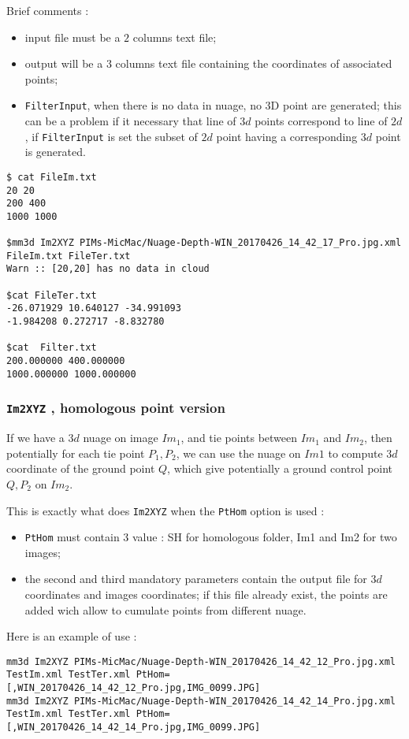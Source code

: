 Brief comments :

\begin{itemize}
    \item input file must be a $2$ columns text file;

    \item output will be a $3$ columns text file containing the coordinates of associated points;

    \item {\tt FilterInput}, when there is no data in nuage, no 3D point  are generated; this can be a problem 
          if it necessary that line of $3d$ points correspond to line of $2d$, if {\tt FilterInput}
          is set the subset of $2d$ point having a corresponding $3d$ point is generated.
\end{itemize}


\begin{verbatim}
$ cat FileIm.txt
20 20
200 400
1000 1000

$mm3d Im2XYZ PIMs-MicMac/Nuage-Depth-WIN_20170426_14_42_17_Pro.jpg.xml FileIm.txt FileTer.txt
Warn :: [20,20] has no data in cloud

$cat FileTer.txt
-26.071929 10.640127 -34.991093
-1.984208 0.272717 -8.832780

$cat  Filter.txt 
200.000000 400.000000
1000.000000 1000.000000
\end{verbatim}


\subsubsection{{\tt Im2XYZ} , homologous point version}

\label{Im2XYZ:Hom}

If we have a $3d$ nuage on image $Im_1$, and tie points between
$Im_1$ and $Im_2$, then potentially for each tie point $P_1,P_2$,
we can use the nuage on $Im1$ to compute $3d$ coordinate of the ground point $Q$, which give
potentially a ground control point $Q,P_2$ on $Im_2$.  

This is exactly what does {\tt Im2XYZ} when the {\tt PtHom} option is used :

\begin{itemize}
    \item {\tt PtHom} must contain 3 value : SH for  homologous folder, Im1 and Im2 for two images;
    \item  the second and third mandatory parameters contain  the output file for $3d$ coordinates
           and images coordinates; if this file already exist, the points are added wich allow
           to cumulate points from different nuage.
\end{itemize}

Here is an example of use :

\begin{verbatim}
mm3d Im2XYZ PIMs-MicMac/Nuage-Depth-WIN_20170426_14_42_12_Pro.jpg.xml TestIm.xml TestTer.xml PtHom=[,WIN_20170426_14_42_12_Pro.jpg,IMG_0099.JPG]
mm3d Im2XYZ PIMs-MicMac/Nuage-Depth-WIN_20170426_14_42_14_Pro.jpg.xml TestIm.xml TestTer.xml PtHom=[,WIN_20170426_14_42_14_Pro.jpg,IMG_0099.JPG]
\end{verbatim}


